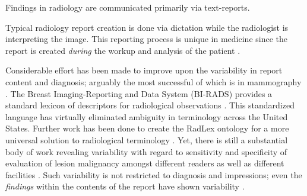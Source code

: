 Findings in radiology are communicated primarily via text-reports.


Typical radiology report creation is done via dictation while the radiologist is interpreting the image. This reporting process is unique in medicine since the report is created \emph{during} the workup and analysis of the patient \cite{Noumeir:2006cb}.


Considerable effort has been made to improve upon the variability in report content and diagnosis; arguably the most successful of which is in mammography \cite{Langlotz:2009fn,Burnside:2009ki}. The Breast Imaging-Reporting and Data System (BI-RADS) provides a standard lexicon of descriptors for radiological observations \cite{Liberman:ws}. This standardized language has virtually eliminated ambiguity in terminology across the United States. Further work has been done to create the RadLex ontology for a more universal solution to radiological terminology \cite{Langlotz:2006jn}. Yet, there is still a substantial body of work revealing variability with regard to sensitivity and specificity of evaluation of lesion malignancy amongst different readers as well as different facilities \cite{Jackson:2009fw, Beam:1996ui, Elmore:2002vc, Taplin:2008bv}. Such variability is not restricted to diagnosis and impressions; even the \emph{findings} within the contents of the report have shown variability \cite{Hobby:2000th, Robinson:1997uq}.